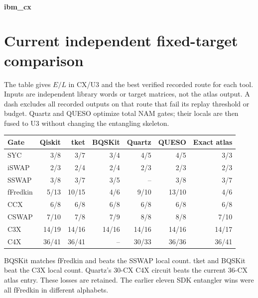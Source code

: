 \documentclass[11pt]{article}
\begin{document}
\paragraph{ibm\_cx}\begin{center}\end{center}
\section{Current independent fixed-target comparison}
The table gives $E/L$ in CX/U3 and the best verified recorded route for each
tool. Inputs are independent library words or target matrices, not the
atlas output. A dash excludes all recorded outputs on that route that fail
its replay threshold or budget. Quartz and QUESO optimize total NAM gates;
their locals are then fused to U3 without changing the entangling skeleton.
\begin{center}\small\begin{tabular}{lrrrrrr}\toprule
Gate & Qiskit & tket & BQSKit & Quartz & QUESO & Exact atlas\\\midrule
SYC & 3/8 & 3/7 & 3/4 & 4/5 & 4/5 & 3/3\\
iSWAP & 2/3 & 2/4 & 2/4 & 2/3 & 2/3 & 2/3\\
SSWAP & 3/8 & 3/7 & 3/5 & -- & 3/8 & 3/7\\
fFredkin & 5/13 & 10/15 & 4/6 & 9/10 & 13/10 & 4/6\\
CCX & 6/8 & 6/8 & 6/8 & 6/8 & 6/8 & 6/8\\
CSWAP & 7/10 & 7/8 & 7/9 & 8/8 & 8/8 & 7/10\\
C3X & 14/19 & 14/16 & 14/16 & 14/16 & 14/16 & 14/17\\
C4X & 36/41 & 36/41 & -- & 30/33 & 36/36 & 36/41\\
\bottomrule\end{tabular}\end{center}
BQSKit matches fFredkin and beats the SSWAP local count. tket and
BQSKit beat the C3X local count. Quartz's 30-CX C4X circuit beats the current
36-CX atlas entry. These losses are retained. The earlier eleven SDK
entangler wins were all fFredkin in different alphabets.
\end{document}
